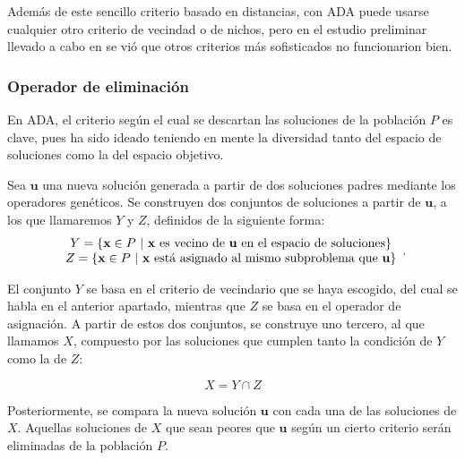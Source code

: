 Además de este sencillo criterio basado en distancias, con ADA puede usarse cualquier otro criterio de vecindad o de nichos, pero en el estudio preliminar llevado a cabo en \cite{tanabe2019framework} se vió que otros criterios más sofisticados no funcionarion bien.



\subsubsection{Operador de eliminación}

En ADA, el criterio según el cual se descartan las soluciones de la población $P$ es clave, pues ha sido ideado teniendo en mente  la diversidad tanto del espacio de soluciones como la del espacio objetivo.

Sea $\textbf{u}$ una nueva solución generada a partir de dos soluciones padres mediante los operadores genéticos. Se construyen dos conjuntos de soluciones a partir de $\textbf{u}$, a los que llamaremos $Y$ y $Z$, definidos de la siguiente forma:
\begin{equation}
	\begin{array}{c}
		Y = \{ \textbf{x} \in P ~|~ \text{\textbf{x} es vecino de \textbf{u} en el espacio de soluciones} \} \\ 
		Z = \{ \textbf{x} \in P ~|~ \text{\textbf{x} está asignado al mismo subproblema que \textbf{u}} \}
	\end{array}.
\end{equation}


El conjunto $Y$ se basa en el criterio de vecindario que se haya escogido, del cual se habla en el anterior apartado, mientras que $Z$ se basa en el operador de asignación. A partir de estos dos conjuntos, se construye uno tercero, al que llamamos $X$, compuesto por las soluciones que cumplen tanto la condición de $Y$ como la de $Z$: 

\begin{equation}
	X = Y \cap Z
\end{equation}

Posteriormente, se compara la nueva solución $\textbf{u}$ con cada una de las soluciones de $X$. Aquellas soluciones de $X$ que sean peores que $\textbf{u}$ según un cierto criterio serán eliminadas de la población $P$.

